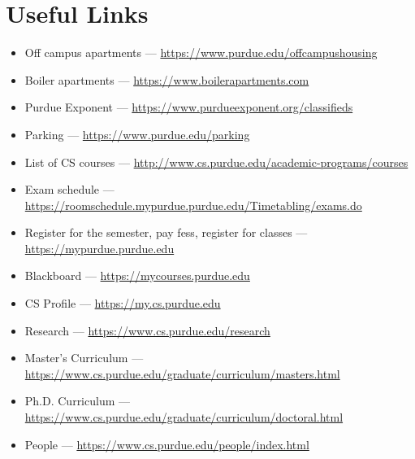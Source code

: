 \section{Useful Links}

\begin{itemize}

	\item Off campus apartments --- \url{https://www.purdue.edu/offcampushousing}

	\item Boiler apartments --- \url{https://www.boilerapartments.com}

	\item Purdue Exponent --- \url{https://www.purdueexponent.org/classifieds}

	\item Parking --- \url{https://www.purdue.edu/parking}

	\item List of CS courses --- \url{http://www.cs.purdue.edu/academic-programs/courses}

	\item Exam schedule --- \url{https://roomschedule.mypurdue.purdue.edu/Timetabling/exams.do}

	\item Register for the semester, pay fess, register for classes --- \url{https://mypurdue.purdue.edu}

	\item Blackboard --- \url{https://mycourses.purdue.edu}

	\item CS Profile --- \url{https://my.cs.purdue.edu}

	\item Research --- \url{https://www.cs.purdue.edu/research}

	\item Master's Curriculum --- \url{https://www.cs.purdue.edu/graduate/curriculum/masters.html}

	\item Ph.D. Curriculum --- \url{https://www.cs.purdue.edu/graduate/curriculum/doctoral.html}

	\item People --- \url{https://www.cs.purdue.edu/people/index.html}


\end{itemize}